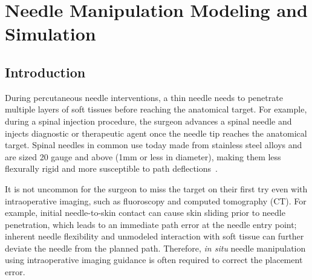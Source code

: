 \chapter{Needle Manipulation Modeling and Simulation} \label{chap:chap-3}


\section{Introduction}
\label{sec:chap_3_introduction}




During percutaneous needle interventions, a thin needle needs to penetrate multiple layers of soft tissues before reaching the anatomical target. For example, during a spinal injection procedure, the surgeon advances a spinal needle and injects diagnostic or therapeutic agent once the needle tip reaches the anatomical target. Spinal needles in common use today made from stainless steel alloys and are sized 20 gauge and above (1mm or less in diameter), making them less flexurally rigid and more susceptible to path deflections~\parencite{calthorpe2004history,silbergleit2001imaging,tsen2006needles}.

It is not uncommon for the surgeon to miss the target on their first try even with intraoperative imaging, such as fluoroscopy and computed tomography (CT). For example, initial needle-to-skin contact can cause skin sliding prior to needle penetration, which leads to an immediate path error at the needle entry point; inherent needle flexibility and unmodeled interaction with soft tissue can further deviate the needle from the planned path. Therefore, \emph{in situ} needle manipulation using intraoperative imaging guidance is often required to correct the placement error.

